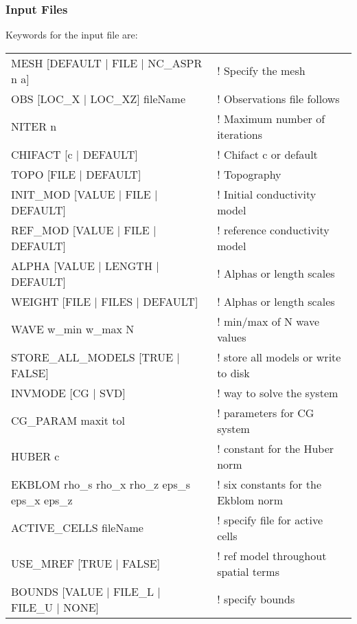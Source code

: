 \subsubsection{Input Files}
Keywords for the input file  are:
%
\begin{fileExample}
\begin{tabular}{|ll|}
\hline
MESH [DEFAULT | FILE | NC\_ASPR n a] & ! Specify the mesh \\
OBS [LOC\_X | LOC\_XZ] fileName & ! Observations file follows \\
NITER n & ! Maximum number of iterations \\
CHIFACT [c | DEFAULT] & ! Chifact c or default \\
TOPO [FILE | DEFAULT] & ! Topography \\
INIT\_MOD [VALUE | FILE | DEFAULT] & ! Initial conductivity model \\
REF\_MOD [VALUE | FILE | DEFAULT] & ! reference conductivity model \\
ALPHA [VALUE | LENGTH | DEFAULT] & ! Alphas or length scales \\
WEIGHT [FILE | FILES | DEFAULT] & ! Alphas or length scales \\
WAVE w\_min w\_max N & ! min/max of N wave values \\
STORE\_ALL\_MODELS [TRUE | FALSE] & ! store all models or write to disk \\
INVMODE [CG | SVD] & ! way to solve the system \\
CG\_PARAM maxit tol & ! parameters for CG system \\
HUBER c & ! constant for the Huber norm \\
EKBLOM rho\_s rho\_x rho\_z eps\_s eps\_x eps\_z & ! six constants for the Ekblom norm \\
ACTIVE\_CELLS fileName & ! specify file for active cells \\
USE\_MREF [TRUE | FALSE] & ! ref model throughout spatial terms \\
BOUNDS [VALUE | FILE\_L | FILE\_U | NONE] & ! specify bounds\\
\hline
\end{tabular}
\end{fileExample}

